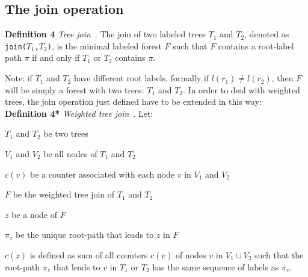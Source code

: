 \documentclass[a4paper,10pt]{report}
\begin{document}
\subsection{The join operation}

\textbf{Definition 4} \emph{Tree join}~\cite{kccf}. 
The join of two labeled trees $T_1$ and $T_2$, denoted as 
\texttt{join(}$T_1$\texttt{,}$T_2$\texttt{)}, 
is the minimal labeled forest $F$ such that $F$ contains a root-label path $\pi$ if and 
only if $T_1$ or $T_2$ contains $\pi$.

Note: if $T_1$ and $T_2$ have different root labels, 
formally if $l(r_1)\ne l(r_2)$, then $F$ will be simply a forest with two trees: $T_1$ and $T_2$. In order to deal with weighted trees, the join operation just defined have to be extended in this way: \\

\noindent
\textbf{Definition 4*} \emph{Weighted tree join}~\cite{kccf}.
Let: 

\renewcommand{\labelitemi}{$-$}

\begin{itemize*}
\item $T_1$ and $T_2$ be two trees
\item $V_1$ and $V_2$ be all nodes of $T_1$ and $T_2$
\item $c(v)$ be a counter associated with each node $v$ in $V_1$ and $V_2$
\item $F$ be the weighted tree join of $T_1$ and $T_2$
\item $z$ be a node of $F$
\item $\pi_z$ be the unique root-path that leads to $z$ in $F$
\end{itemize*}
\renewcommand{\labelitemi}{$\bullet$}
$c(z)$ is defined as sum of all counters $c(v)$ of nodes $v$ in $V_1 \cup V_2$ such
that the root-path $\pi_z$ that leads to $v$ in $T_1$ or $T_2$ has the same sequence of 
labels as $\pi_z$.
\end{document}
